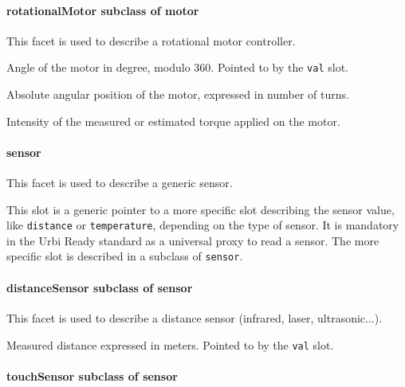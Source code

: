 \paragraph{rotationalMotor \textmd{subclass of motor}}


This facet is used to describe a rotational motor controller.

\begin{slots}
  {%
    Angle of the motor in degree, modulo 360. Pointed to by the
    \texttt{val} slot.%
  }

  {%
    Absolute angular position of the motor, expressed in number of
    turns.%
  }

  {%
    Intensity of the measured or estimated torque applied on the
    motor.%
  }

\end{slots}


\paragraph{sensor}

This facet is used to describe a generic sensor.

\begin{slots}
  {%
    This slot is a generic pointer to a more specific slot describing
    the sensor value, like \texttt{distance} or \texttt{temperature},
    depending on the type of sensor. It is mandatory in the Urbi Ready
    standard as a universal proxy to read a sensor. The more specific
    slot is described in a subclass of \texttt{sensor}.%
  }

\end{slots}


\paragraph{ distanceSensor  \textmd{subclass of sensor}}

This facet is used to describe a distance sensor (infrared, laser,
ultrasonic...).

\begin{slots}
  {%
    Measured distance expressed in meters.  Pointed to by the
    \texttt{val} slot.%
  }

\end{slots}


\paragraph{ touchSensor  \textmd{subclass of sensor}}


